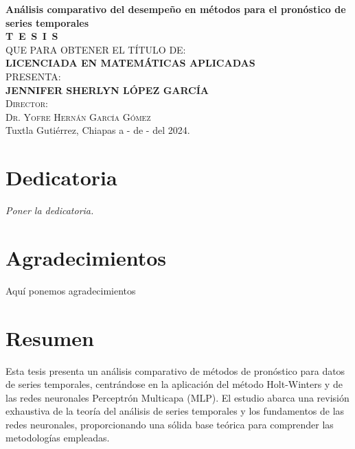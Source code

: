 \documentclass[
  us-letterpaper,
]{scrreprt}
\renewcommand*\contentsname{Tabla de contenidos}
\newcommand\contentsname{Tabla de contenidos}
\theoremstyle{plain}
\theoremstyle{definition}
\theoremstyle{plain}
\theoremstyle{definition}
\theoremstyle{remark}
\begin{document}
\begin{titlepage}
\begin{minipage}[t][0.95\textheight][c]{0.7\textwidth}
            \begin{center}
                {\Large\bfseries Análisis comparativo del desempeño en métodos para el pronóstico de series temporales}\\[2cm]
                \textsc{\huge \textbf{T\, E\, S\, I\, S}}\\[1.5cm]
                \textsc{\large QUE PARA OBTENER EL TÍTULO DE:}\\[0.3cm]
                \textbf{\textsc{LICENCIADA EN MATEMÁTICAS APLICADAS}}\\[1.5cm]
                \textsc{\large PRESENTA:}\\[0.3cm]
                \textbf{\textsc{\large {JENNIFER SHERLYN LÓPEZ GARCÍA}}}\\[2cm]
                {\large\scshape Director:\\[0.3cm]
                {\large Dr. Yofre Hernán García Gómez }}\\[2.0cm]
                \large{Tuxtla Gutiérrez, Chiapas a - de - del 2024.}

            \end{center}
\end{minipage}
\end{titlepage}

\pagebreak[2]

\chapter*{Dedicatoria}
\begin{flushright}
\textit{Poner la dedicatoria.}
\end{flushright}


\chapter*{Agradecimientos}
Aquí ponemos agradecimientos
\renewcommand*\contentsname{Tabla de contenidos}
{
\hypersetup{linkcolor=}
\setcounter{tocdepth}{2}
\tableofcontents
}

\chapter*{Resumen}\label{resumen}


Esta tesis presenta un análisis comparativo de métodos de pronóstico
para datos de series temporales, centrándose en la aplicación del método
Holt-Winters y de las redes neuronales Perceptrón Multicapa (MLP). El
estudio abarca una revisión exhaustiva de la teoría del análisis de
series temporales y los fundamentos de las redes neuronales,
proporcionando una sólida base teórica para comprender las metodologías
empleadas.
\end{document}
